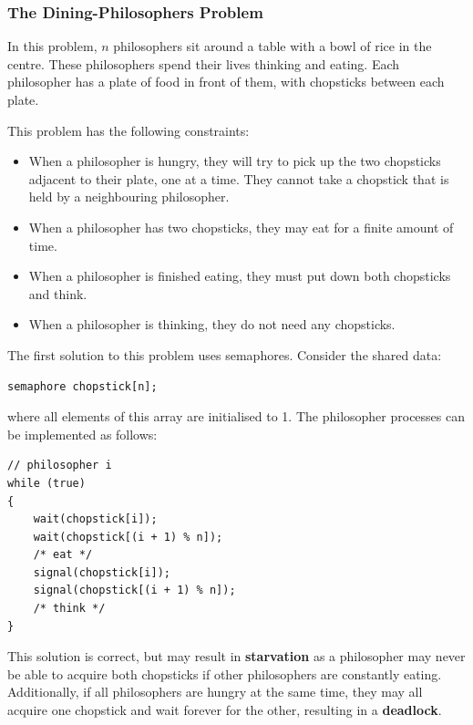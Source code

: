 \documentclass{article}
\begin{document}
\subsubsection{The Dining-Philosophers Problem}
In this problem, \(n\) philosophers sit around a table with a bowl of
rice in the centre. These philosophers spend their lives thinking and
eating. Each philosopher has a plate of food in front of them, with
chopsticks between each plate.

This problem has the following constraints:
\begin{itemize}
    \item When a philosopher is hungry, they will try to pick up the
          two chopsticks adjacent to their plate, one at a time. They
          cannot take a chopstick that is held by a neighbouring
          philosopher.
    \item When a philosopher has two chopsticks, they may eat for a
          finite amount of time.
    \item When a philosopher is finished eating, they must put down
          both chopsticks and think.
    \item When a philosopher is thinking, they do not need any
          chopsticks.
\end{itemize}
The first solution to this problem uses semaphores. Consider the shared
data:
\begin{verbatim}
semaphore chopstick[n];
\end{verbatim}
where all elements of this array are initialised to 1. The philosopher
processes can be implemented as follows:
\begin{verbatim}
// philosopher i
while (true)
{
    wait(chopstick[i]);
    wait(chopstick[(i + 1) % n]);
    /* eat */
    signal(chopstick[i]);
    signal(chopstick[(i + 1) % n]);
    /* think */
}
\end{verbatim}
This solution is correct, but may result in \textbf{starvation} as a
philosopher may never be able to acquire both chopsticks if other
philosophers are constantly eating. Additionally, if all philosophers
are hungry at the same time, they may all acquire one chopstick and
wait forever for the other, resulting in a \textbf{deadlock}.
\end{document}
